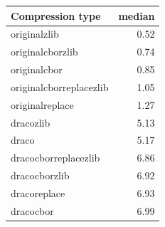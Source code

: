 \begin{table}[!h]
\begin{minipage}{.5\linewidth}
\begin{tabular}{|l|r|}
\hline
Compression type & median\\
\hline
originalzlib & 0.52\\
\hline
originalcborzlib & 0.74\\
\hline
originalcbor & 0.85\\
\hline
originalcborreplacezlib & 1.05\\
\hline
originalreplace & 1.27\\
\hline
dracozlib & 5.13\\
\hline
draco & 5.17\\
\hline
dracocborreplacezlib & 6.86\\
\hline
dracocborzlib & 6.92\\
\hline
dracoreplace & 6.93\\
\hline
dracocbor & 6.99\\
\hline
\end{tabular}
\end{minipage} 
\end{table}
